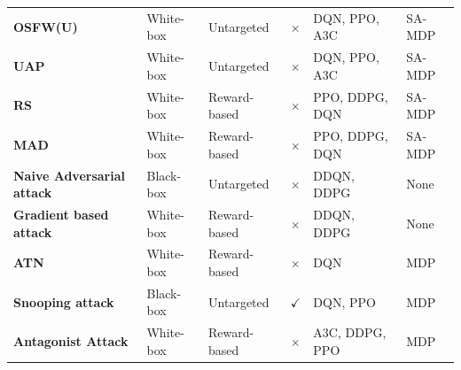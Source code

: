 \documentclass[conference,compsoc]{IEEEtran}
\begin{document}
\begin{table}
\begin{tabulary}{1.0\textwidth}{Lp{2cm}llLl}
\textbf{OSFW(U) \cite{tekgul_real-time_2022}}                                          & White-box                       & Untargeted                  & $\times$                       & DQN, PPO, A3C              & SA-MDP             \\ 
\textbf{UAP \cite{tekgul_real-time_2022}}                                          & White-box                       & Untargeted                  & $\times$                       & DQN, PPO, A3C              & SA-MDP             \\ 
\textbf{RS \cite{zhang_robust_2020-1}}             & White-box                       & Reward-based         & $\times$                      & PPO, DDPG, DQN             & SA-MDP             \\ 
\textbf{MAD \cite{zhang_robust_2020-1}}             & White-box                       & Reward-based         & $\times$                      & PPO, DDPG, DQN             & SA-MDP             \\ 
\textbf{Naive Adversarial attack \cite{pattanaik_robust_2018}}                                       & Black-box                       & Untargeted                  & $\times$                       & DDQN, DDPG                 & None             \\ 
\textbf{Gradient based attack \cite{pattanaik_robust_2018}}                                       & White-box                       & Reward-based                  & $\times$                       & DDQN, DDPG                 & None             \\ 
\textbf{ATN \cite{tretschk_sequential_2018}}                          & White-box                       & Reward-based & $\times$                       & DQN                      & MDP             \\ 
\textbf{Snooping attack \cite{inkawhich_snooping_2020}}                            & Black-box                       & Untargeted                  & $\checkmark$                      & DQN, PPO                   & MDP             \\ 
\textbf{Antagonist Attack \cite{sun_stealthy_2020}}                       & White-box                       & Reward-based         & $\times$                       & A3C, DDPG, PPO             & MDP             \\ 

\end{tabulary}
\end{table}
\end{document}
